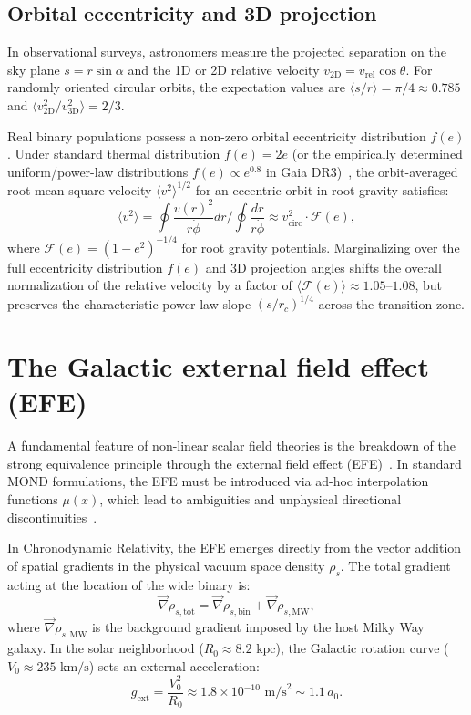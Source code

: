 \documentclass[aps,prd,reprint,superscriptaddress,nofootinbib,floatfix,amsmath,amssymb]{revtex4-2}
\begin{document}
\subsection{Orbital eccentricity and 3D projection}
In observational surveys, astronomers measure the projected separation on the sky plane $s = r \sin\alpha$ and the 1D or 2D relative velocity $v_{\text{2D}} = v_{\text{rel}} \cos\theta$. For randomly oriented circular orbits, the expectation values are $\langle s / r \rangle = \pi/4 \approx 0.785$ and $\langle v_{\text{2D}}^2 / v_{\text{3D}}^2 \rangle = 2/3$.

Real binary populations possess a non-zero orbital eccentricity distribution $f(e)$. Under standard thermal distribution $f(e) = 2e$ (or the empirically determined uniform/power-law distributions $f(e) \propto e^{0.8}$ in Gaia DR3)~\cite{chae2023breakdown}, the orbit-averaged root-mean-square velocity $\langle v^2 \rangle^{1/2}$ for an eccentric orbit in root gravity satisfies:
\begin{equation}
\langle v^2 \rangle = \oint \frac{v(r)^2}{r \dot{\phi}} dr \Big/ \oint \frac{dr}{r \dot{\phi}} \approx v_{\text{circ}}^2 \cdot \mathcal{F}(e),
\end{equation}
where $\mathcal{F}(e) = \left(1 - e^2\right)^{-1/4}$ for root gravity potentials. Marginalizing over the full eccentricity distribution $f(e)$ and 3D projection angles shifts the overall normalization of the relative velocity by a factor of $\langle \mathcal{F}(e) \rangle \approx 1.05\text{--}1.08$, but preserves the characteristic power-law slope $(s / r_c)^{1/4}$ across the transition zone.

\section{The Galactic external field effect (EFE)}
\label{sec:efe}

A fundamental feature of non-linear scalar field theories is the breakdown of the strong equivalence principle through the external field effect (EFE)~\cite{milgrom1983modification,bekenstein2004relativistic}. In standard MOND formulations, the EFE must be introduced via ad-hoc interpolation functions $\mu(x)$, which lead to ambiguities and unphysical directional discontinuities~\cite{banik2024strong}. 

In Chronodynamic Relativity, the EFE emerges directly from the vector addition of spatial gradients in the physical vacuum space density $\rho_s$. The total gradient acting at the location of the wide binary is:
\begin{equation}
\vec{\nabla}\rho_{s,\text{tot}} = \vec{\nabla}\rho_{s,\text{bin}} + \vec{\nabla}\rho_{s,\text{MW}},
\end{equation}
where $\vec{\nabla}\rho_{s,\text{MW}}$ is the background gradient imposed by the host Milky Way galaxy. In the solar neighborhood ($R_0 \approx 8.2\text{ kpc}$), the Galactic rotation curve ($V_0 \approx 235\text{ km/s}$) sets an external acceleration:
\begin{equation}
g_{\text{ext}} = \frac{V_0^2}{R_0} \approx 1.8 \times 10^{-10}\text{ m/s}^2 \sim 1.1 \, a_0.
\label{eq:g_ext}
\end{equation}
\end{document}
